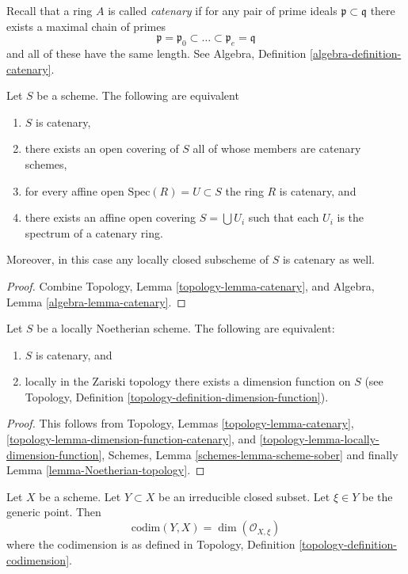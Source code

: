 \noindent
Recall that a ring $A$ is called {\it catenary} if
for any pair of prime ideals $\mathfrak p \subset \mathfrak q$
there exists a maximal chain of primes
$$
\mathfrak p =
\mathfrak p_0 \subset \ldots \subset \mathfrak p_e
= \mathfrak q
$$
and all of these have the same length. See
Algebra, Definition \ref{algebra-definition-catenary}.

\begin{lemma}
\label{lemma-catenary-local}
Let $S$ be a scheme. The following are equivalent
\begin{enumerate}
\item $S$ is catenary,
\item there exists an open covering of $S$ all of whose members are
catenary schemes,
\item for every affine open $\text{Spec}(R) = U \subset S$ the ring
$R$ is catenary, and
\item there exists an affine open covering $S = \bigcup U_i$ such
that each $U_i$ is the spectrum of a catenary ring.
\end{enumerate}
Moreover, in this case any locally closed subscheme of $S$ is catenary
as well.
\end{lemma}

\begin{proof}
Combine Topology, Lemma \ref{topology-lemma-catenary}, and
Algebra, Lemma \ref{algebra-lemma-catenary}.
\end{proof}

\begin{lemma}
\label{lemma-catenary-dimension-function}
Let $S$ be a locally Noetherian scheme.
The following are equivalent:
\begin{enumerate}
\item $S$ is catenary, and
\item locally in the Zariski topology there exists a dimension function
on $S$ (see Topology, Definition \ref{topology-definition-dimension-function}).
\end{enumerate}
\end{lemma}

\begin{proof}
This follows from
Topology, Lemmas
\ref{topology-lemma-catenary},
\ref{topology-lemma-dimension-function-catenary}, and
\ref{topology-lemma-locally-dimension-function},
Schemes, Lemma \ref{schemes-lemma-scheme-sober}
and finally Lemma \ref{lemma-Noetherian-topology}.
\end{proof}

\begin{lemma}
\label{lemma-codimension-local-ring}
Let $X$ be a scheme. Let $Y \subset X$ be an irreducible closed
subset. Let $\xi \in Y$ be the generic point. Then
$$
\text{codim}(Y, X) = \dim(\mathcal{O}_{X, \xi})
$$
where the codimension is as defined in
Topology, Definition \ref{topology-definition-codimension}.
\end{lemma}


